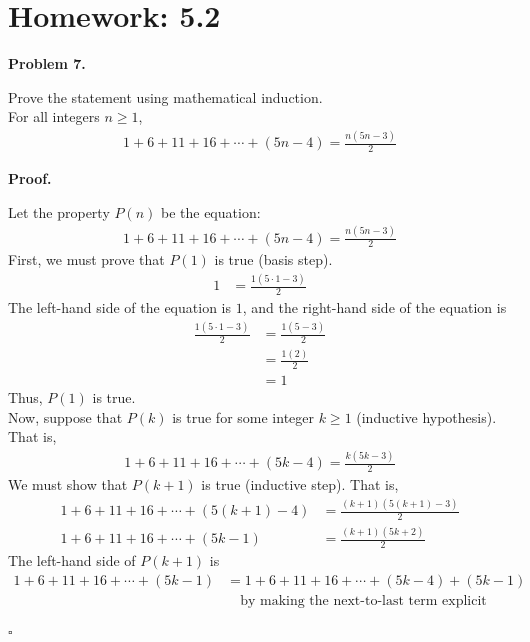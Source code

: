\documentclass{article}
\newenvironment{problem}[1]{
    \begin{mdframed}[backgroundcolor=gray!20, skipabove=\baselineskip, skipbelow=\baselineskip, nobreak=true, innerleftmargin=10pt, innerrightmargin=10pt, innertopmargin=10pt, innerbottommargin=10pt]
    \textbf{Problem #1.}
}{
    \end{mdframed}
}
\newenvironment{proof}{
    \begin{mdframed}[nobreak=false, innerleftmargin=10pt, innerrightmargin=10pt, innertopmargin=10pt, innerbottommargin=10pt]
    \textbf{Proof.}
}{
    \hfill $\square$
    \end{mdframed}
}
\begin{document}
\newpage \section{Homework: 5.2}
    \begin{problem}{7}
        Prove the statement using mathematical induction. \\
        For all integers $n \geq 1$,
        \begin{align*}
            1 + 6 + 11 + 16 + \cdots + (5n-4) = \frac{n(5n-3)}{2}
        \end{align*}
    \end{problem}
    \begin{proof}
        Let the property $P(n)$ be the equation:
        \begin{align*}
            1 + 6 + 11 + 16 + \cdots + (5n-4) = \frac{n(5n-3)}{2}
        \end{align*}
        First, we must prove that $P(1)$ is true (basis step).
        \begin{align*}
            1 &= \frac{1(5 \cdot 1-3)}{2}
        \end{align*}
        The left-hand side of the equation is $1$, and the right-hand side of the equation is
        \begin{align*}
            \frac{1(5 \cdot 1-3)}{2} &= \frac{1(5-3)}{2} \\
            &= \frac{1(2)}{2} \\
            &= 1
        \end{align*}
        Thus, $P(1)$ is true. \\
        Now, suppose that $P(k)$ is true for some integer $k \geq 1$ (inductive hypothesis). That is,
        \begin{align*}
            1 + 6 + 11 + 16 + \cdots + (5k-4) = \frac{k(5k-3)}{2}
        \end{align*}
        We must show that $P(k+1)$ is true (inductive step). That is,
        \begin{align*}
            1 + 6 + 11 + 16 + \cdots + (5(k+1)-4) &= \frac{(k+1)(5(k+1)-3)}{2} \\
            1 + 6 + 11 + 16 + \cdots + (5k-1) &= \frac{(k+1)(5k+2)}{2}
        \end{align*}
        The left-hand side of $P(k+1)$ is
        \begin{align*}
            1 + 6 + 11 + 16 + \cdots + (5k-1) & = 1 + 6 + 11 + 16 + \cdots + (5k-4) + (5k-1) \\
            & \quad \text{by making the next-to-last term explicit} \\

\end{align*}
\end{proof}
\end{document}
